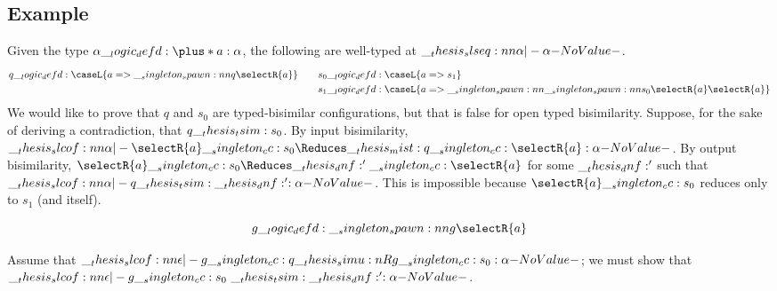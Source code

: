 \subsection{Example}

Given the type $\alpha \defd \plus*{a:\alpha}$, the following are well-typed at $\slseq{\alpha |- \alpha}$.
\begin{equation*}
  q \defd \caseL{a => \spawn{q}{\selectR{a}}}
  \qquad
  \begin{lgathered}[t]
    s_0 \defd \caseL{a => s_1} \\
    s_1 \defd \caseL{a => \spawn{\spawn{s_0}{\selectR{a}}}{\selectR{a}}}
  \end{lgathered}
\end{equation*}
We would like to prove that $q$ and $s_0$ are typed-bisimilar configurations, but that is false for open typed bisimilarity.
Suppose, for the sake of deriving a contradiction, that $q \__thesis_tsim: s_0$.
By input bisimilarity, $\slcof{\alpha |- \selectR{a} \cc s_0 \Reduces\mist q \cc \selectR{a} : \alpha}$.
By output bisimilarity, $\selectR{a} \cc s_0 \Reduces \dnf' \cc \selectR{a}$ for some $\__thesis_dnf:'$ such that $\slcof{\alpha |- q \tsim \dnf' : \alpha}$.
This is impossible because $\selectR{a} \cc s_0$ reduces only to $s_1$ (and itself).


\begin{equation*}
  g \defd \spawn{g}{\selectR{a}}
\end{equation*}

\begin{description}
\item{}
\item[Immediate input bisimulation]
  Assume that $\slcof{\epsilon |- g \cc q \simu{R} g \cc s_0 : \alpha}$;
  we must show that $\slcof{\epsilon |- g \cc s_0 \ \tsim \dnf' : \alpha}$.
\end{description}

